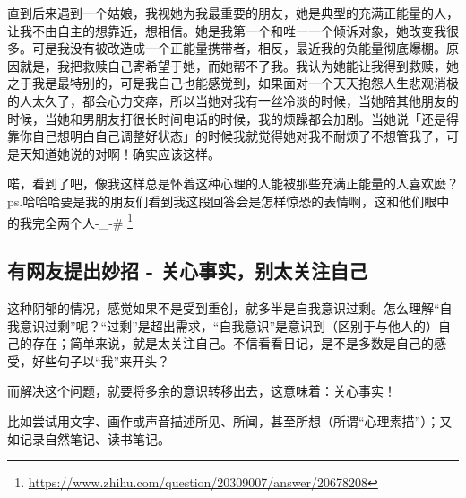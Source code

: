 直到后来遇到一个姑娘，我视她为我最重要的朋友，她是典型的充满正能量的人，让我不由自主的想靠近，想相信。她是我第一个和唯一一个倾诉对象，她改变我很多。可是我没有被改造成一个正能量携带者，相反，最近我的负能量彻底爆棚。原因就是，我把救赎自己寄希望于她，而她帮不了我。我认为她能让我得到救赎，她之于我是最特别的，可是我自己也能感觉到，如果面对一个天天抱怨人生悲观消极的人太久了，都会心力交瘁，所以当她对我有一丝冷淡的时候，当她陪其他朋友的时候，当她和男朋友打很长时间电话的时候，我的烦躁都会加剧。当她说「还是得靠你自己想明白自己调整好状态」的时候我就觉得她对我不耐烦了不想管我了，可是天知道她说的对啊！确实应该这样。

喏，看到了吧，像我这样总是怀着这种心理的人能被那些充满正能量的人喜欢麽？ps.哈哈哈要是我的朋友们看到我这段回答会是怎样惊恐的表情啊，这和他们眼中的我完全两个人-_-# \footnote{\url{https://www.zhihu.com/question/20309007/answer/20678208}}

\subsection{有网友提出妙招 - 关心事实，别太关注自己}

这种阴郁的情况，感觉如果不是受到重创，就多半是自我意识过剩。怎么理解“自我意识过剩”呢？“过剩”是超出需求，“自我意识”是意识到（区别于与他人的）自己的存在；简单来说，就是太关注自己。不信看看日记，是不是多数是自己的感受，好些句子以“我”来开头？

而解决这个问题，就要将多余的意识转移出去，这意味着：关心事实！

比如尝试用文字、画作或声音描述所见、所闻，甚至所想（所谓“心理素描”）；又如记录自然笔记、读书笔记。

